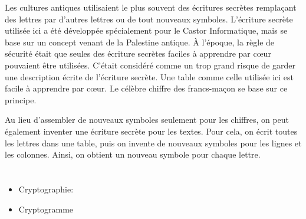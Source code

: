 {{Les cultures antiques utilisaient le plus souvent des écritures secrètes remplaçant des lettres par d’autres lettres ou de tout nouveaux symboles. L’écriture secrète utilisée ici a été développée spécialement pour le Castor Informatique, mais se base sur un concept venant de la Palestine antique. À l’époque, la règle de sécurité était que seules des écriture secrètes faciles à apprendre par cœur pouvaient être utilisées. C’était considéré comme un trop grand risque de garder une description écrite de l’écriture secrète. Une table comme celle utilisée ici est facile à apprendre par cœur. Le célèbre chiffre des francs-maçon se base sur ce principe.

Au lieu d’assembler de nouveaux symboles seulement pour les chiffres, on peut également inventer une écriture secrète pour les textes. Pour cela, on écrit toutes les lettres dans une table, puis on invente de nouveaux symboles pour les lignes et les colonnes. Ainsi, on obtient un nouveau symbole pour chaque lettre.



\section*{\BrochureWebsitesAndKeywords}
{\raggedright
\begin{itemize}
  \item Cryptographie: \href{https://fr.wikipedia.org/wiki/Cryptographie}{}
  \item Cryptogramme
\end{itemize}


}

}{}

\def\AuthorHromkovicJ{} %
\def\AuthorLacherR{} %
\def\AuthorDatzkoS{} %
\def\AuthorChanS{} %
\def\AuthorBergsveinsdottirL{} %
\def\AuthorNaughtonT{} %
\def\AuthorPelletE{} %

\newpage}{}
